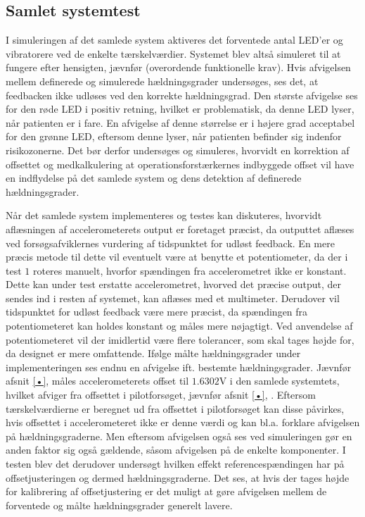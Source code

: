 \subsection{Samlet systemtest }
I simuleringen af det samlede system aktiveres det forventede antal LED'er og vibratorere ved de enkelte tærskelværdier. Systemet blev altså simuleret til at fungere efter hensigten, jævnfør (overordende funktionelle krav). Hvis afvigelsen mellem definerede og simulerede hældningsgrader undersøges, ses det, at feedbacken ikke udløses ved den korrekte hældningsgrad. Den største afvigelse ses for den røde LED i positiv retning, hvilket er problematisk, da denne LED lyser, når patienten er i fare. En afvigelse af denne størrelse er i højere grad acceptabel for den grønne LED, eftersom denne lyser, når patienten befinder sig indenfor risikozonerne. Det bør derfor undersøges og simuleres, hvorvidt en korrektion af offsettet og medkalkulering at operationsforstærkernes indbyggede offset vil have en indflydelse på det samlede system og dens detektion af definerede hældningsgrader. 

Når det samlede system implementeres og testes kan diskuteres, hvorvidt aflæsningen af accelerometerets output er foretaget præcist, da outputtet aflæses ved forsøgsafviklernes vurdering af tidspunktet for udløst feedback. En mere præcis metode til dette vil eventuelt være at benytte et potentiometer, da der i test $1$ roteres manuelt, hvorfor spændingen fra accelerometret ikke er konstant. Dette kan under test erstatte accelerometret, hvorved det præcise output, der sendes ind i resten af systemet, kan aflæses med et multimeter. Derudover vil tidspunktet for udløst feedback være mere præcist, da spændingen fra potentiometeret kan holdes konstant og måles mere nøjagtigt. Ved anvendelse af potentiometeret vil der imidlertid være flere tolerancer, som skal tages højde for, da designet er mere omfattende. Ifølge målte hældningsgrader under implementeringen ses endnu en afvigelse ift. bestemte hældningsgrader. Jævnfør afsnit \ref{•}, \pageref{•} måles accelerometerets offset til $1.6302$V i den samlede systemtets, hvilket afviger fra offsettet i pilotforsøget, jævnfør afsnit \ref{•}, \pageref{•}. Eftersom tærskelværdierne er beregnet ud fra offsettet i pilotforsøget kan disse påvirkes, hvis offsettet i accelerometeret ikke er denne værdi og kan bl.a. forklare afvigelsen på hældningsgraderne. Men eftersom afvigelsen også ses ved simuleringen gør en anden faktor sig også gældende, såsom afvigelsen på de enkelte komponenter. 
I testen blev det derudover undersøgt hvilken effekt referencespændingen har på offsetjusteringen og dermed hældningsgraderne. Det ses, at hvis der tages højde for kalibrering af offsetjustering er det muligt at gøre afvigelsen mellem de forventede og målte hældningsgrader generelt lavere. 

